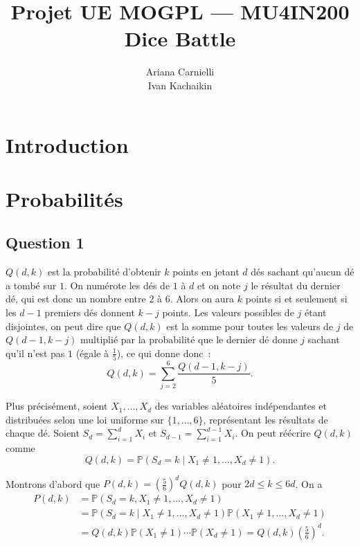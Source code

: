 \documentclass[a4paper,11pt]{amsart}
\theoremstyle{plain}
\begin{document}

\pagestyle{plain}

\title{Projet UE MOGPL --- MU4IN200 \\ Dice Battle}
\author{Ariana Carnielli \\ Ivan Kachaikin}
\date{}

\maketitle



\section{Introduction}

\section{Probabilités}

\subsection{Question 1}

$Q(d,k)$ est la probabilité d'obtenir $k$ points en jetant $d$ dés sachant qu'aucun dé a tombé sur $1$. On numérote les dés de $1$ à $d$ et on note $j$ le résultat du dernier dé, qui est donc un nombre entre $2$ à $6$. Alors on aura $k$ points si et seulement si les $d-1$ premiers dés donnent $k-j$ points. Les valeurs possibles de $j$ étant disjointes, on peut dire que $Q(d, k)$ est la somme pour toutes les valeurs de $j$ de $Q(d-1, k-j)$ multiplié par la probabilité que le dernier dé donne $j$ sachant qu'il n'est pas $1$ (égale à $\frac{1}{5}$), ce qui donne donc~:
\begin{equation}
\label{RecurrenceQ}
Q(d, k) = \sum_{j=2}^6 \frac{Q(d-1, k-j)}{5}.
\end{equation}

Plus précisément, soient $X_1, \dotsc, X_d$ des variables aléatoires indépendantes et distribuées selon une loi uniforme sur $\{1, \dotsc, 6\}$, représentant les résultats de chaque dé. Soient $S_d = \sum_{i=1}^d X_i$ et $S_{d-1} = \sum_{i=1}^{d-1} X_i$. On peut réécrire $Q(d, k)$ comme
\[
Q(d, k) = \mathbb P(S_d = k \mid X_1 \neq 1, \dotsc, X_d \neq 1).
\]

Montrons d'abord que $P(d, k) = \left(\frac{5}{6}\right)^d Q(d, k)$ pour $2d \leq k \leq 6d$. On a
\begin{align*}
P(d, k) & = \mathbb P(S_d = k, X_1 \neq 1, \dotsc, X_d \neq 1) \\
& = \mathbb P(S_d = k \mid X_1 \neq 1, \dotsc, X_d \neq 1) \mathbb P(X_1 \neq 1, \dotsc, X_d \neq 1) \\
& = Q(d, k) \mathbb P(X_1 \neq 1) \dotsm \mathbb P(X_d \neq 1) = Q(d, k) \left(\tfrac{5}{6}\right)^d.
\end{align*}
\end{document}
